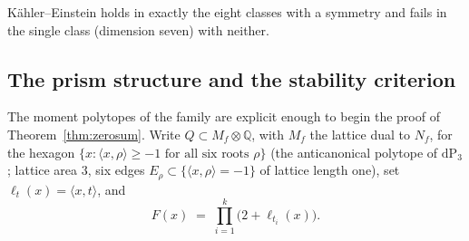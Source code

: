 \documentclass[11pt]{amsart}
\theoremstyle{definition}
\theoremstyle{remark}
\newcommand{\QQ}{\mathbb{Q}}
\newcommand{\dP}{\mathrm{dP}}
\begin{document}
\begin{center}
\end{center}

\noindent K\"ahler--Einstein holds in exactly the eight classes with a
symmetry and fails in the single class (dimension seven) with neither.

\subsection*{The prism structure and the stability criterion}
The moment polytopes of the family are explicit enough to begin the proof
of Theorem~\ref{thm:zerosum}. Write $Q \subset M_f \otimes \QQ$,
with $M_f$ the lattice dual to $N_f$, for
the hexagon $\{x : \langle x, \rho\rangle \ge -1 \text{ for all six roots }
\rho\}$ (the anticanonical polytope of $\dP_3$; lattice area $3$, six edges
$E_\rho \subset \{\langle x,\rho\rangle = -1\}$ of lattice length one), set
$\ell_t(x) = \langle x, t\rangle$, and
\[
F(x) \;=\; \prod_{i=1}^{k}\bigl(2 + \ell_{t_i}(x)\bigr).
\]
\end{document}
